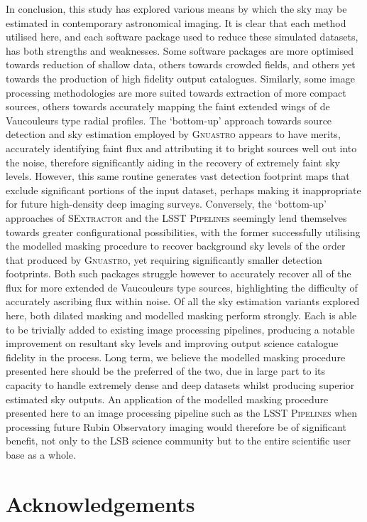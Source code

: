 \documentclass[fleqn,usenatbib,useAMS]{mnras}
\newcommand*{\SExtractor}{\textsc{SExtractor}\xspace}
\newcommand*{\Gnuastro}{\textsc{Gnuastro}\xspace}
\newcommand*{\LSSTPs}{\textsc{LSST Pipelines}\xspace}
\newcommand*{\RO}{Rubin Observatory\xspace}
\begin{document}
In conclusion, this study has explored various means by which the sky may be estimated in contemporary astronomical imaging. It is clear that each method utilised here, and each software package used to reduce these simulated datasets, has both strengths and weaknesses. Some software packages are more optimised towards reduction of shallow data, others towards crowded fields, and others yet towards the production of high fidelity output catalogues. Similarly, some image processing methodologies are more suited towards extraction of more compact sources, others towards accurately mapping the faint extended wings of de Vaucouleurs type radial profiles. The `bottom-up' approach towards source detection and sky estimation employed by \Gnuastro appears to have merits, accurately identifying faint flux and attributing it to bright sources well out into the noise, therefore significantly aiding in the recovery of extremely faint sky levels. However, this same routine generates vast detection footprint maps that exclude significant portions of the input dataset, perhaps making it inappropriate for future high-density deep imaging surveys. Conversely, the `bottom-up' approaches of \SExtractor and the \LSSTPs seemingly lend themselves towards greater configurational possibilities, with the former successfully utilising the modelled masking procedure to recover background sky levels of the order that produced by \Gnuastro, yet requiring significantly smaller detection footprints. Both such packages struggle however to accurately recover all of the flux for more extended de Vaucouleurs type sources, highlighting the difficulty of accurately ascribing flux within noise. Of all the sky estimation variants explored here, both dilated masking and modelled masking perform strongly. Each is able to be trivially added to existing image processing pipelines, producing a notable improvement on resultant sky levels and improving output science catalogue fidelity in the process. Long term, we believe the modelled masking procedure presented here should be the preferred of the two, due in large part to its capacity to handle extremely dense and deep datasets whilst producing superior estimated sky outputs. An application of the modelled masking procedure presented here to an image processing pipeline such as the \LSSTPs when processing future \RO imaging would therefore be of significant benefit, not only to the LSB science community but to the entire scientific user base as a whole. 

\newpage
\section*{Acknowledgements}
\label{sec:acknowledgements}
\end{document}
